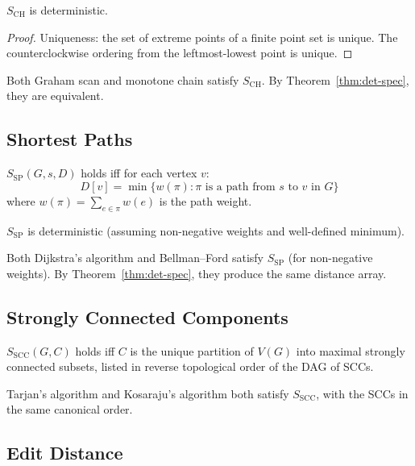 \begin{proposition}
$S_{\mathrm{CH}}$ is deterministic.
\end{proposition}

\begin{proof}
Uniqueness: the set of extreme points of a finite point set is unique.
The counterclockwise ordering from the leftmost-lowest point is unique.
\end{proof}

Both Graham scan and monotone chain satisfy $S_{\mathrm{CH}}$.
By Theorem~\ref{thm:det-spec}, they are equivalent.

\subsection{Shortest Paths}

\begin{definition}
$S_{\mathrm{SP}}(G, s, D)$ holds iff for each vertex $v$:
\[
  D[v] = \min\{w(\pi) : \pi \text{ is a path from } s \text{ to } v
    \text{ in } G\}
\]
where $w(\pi) = \sum_{e \in \pi} w(e)$ is the path weight.
\end{definition}

\begin{proposition}
$S_{\mathrm{SP}}$ is deterministic (assuming non-negative weights
and well-defined minimum).
\end{proposition}

Both Dijkstra's algorithm and Bellman--Ford satisfy $S_{\mathrm{SP}}$
(for non-negative weights).  By Theorem~\ref{thm:det-spec}, they
produce the same distance array.

\subsection{Strongly Connected Components}

\begin{definition}
$S_{\mathrm{SCC}}(G, C)$ holds iff $C$ is the unique partition of
$V(G)$ into maximal strongly connected subsets, listed in reverse
topological order of the DAG of SCCs.
\end{definition}

Tarjan's algorithm and Kosaraju's algorithm both satisfy
$S_{\mathrm{SCC}}$, with the SCCs in the same canonical order.

\subsection{Edit Distance}


